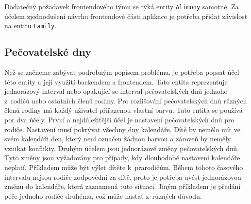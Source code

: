         Dodatečný požadavek frontendového týmu se týká entity \texttt{Alimony} samotné. Za účelem zjednodušení návrhu frontendové části aplikace je potřeba přidat závislost na entitu \texttt{Family}. %
        
    \subsection{Pečovatelské dny}\label{analyza:pozadavky:caredays}
        Než se začneme zabývat podrobným popisem problému, je potřeba popsat účel této entity a její využití backendem a frontendem. Tato entita reprezentuje jednorázový interval nebo opakující se interval pečovatelských dnů jednoho z~rodičů nebo ostatních členů rodiny. Pro rozlišování pečovatelských dnů různých členů rodiny má každý uživatel přiřazenou vlastní barvu. Tato entita se používá por dva účely. První a nejdůležitější účel je nastavení pečovatelských dnů pro rodiče. Nastavení musí pokrývat všechny dny kalendáře. Dítě by nemělo mít ve svém kalendáři den, který není označen žádnou barvou a zároveň by neměly vznikat konflikty. Druhým účelem jsou jednorázové změny pečovatelských dnů. Tyto změny jsou vyžadovány pro případy, kdy dlouhodobé nastavení kalendáře neplatí. Příkladem může být výlet dítěte k~prarodičům. Během tohoto časového intervalu nejsou rodiče zodpovědní za dítě, proto je potřeba uvést jednorázovou změnu do kalendáře, která zaznamená tuto situaci. Jiným příkladem je předání péče jednoho rodiče druhému, což může nastat z~různých důvodu.

